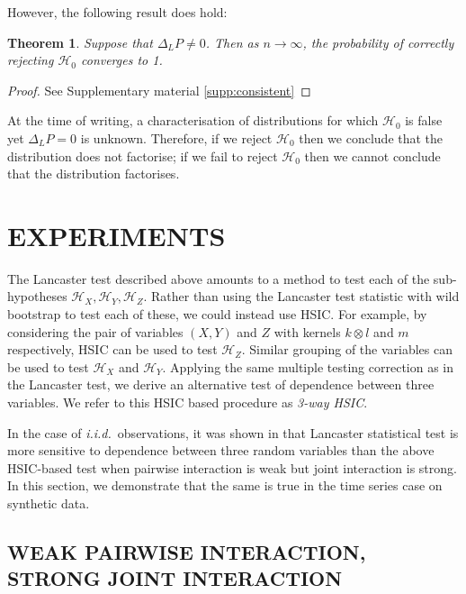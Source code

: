 \documentclass[]{article}
\newtheorem{theorem}{Theorem}
\begin{document}
However, the following result does hold:

\begin{theorem}\label{theorem:consistent}
Suppose that $\Delta_LP \not =0$. Then as $n\longrightarrow\infty$, the probability of correctly rejecting $\mathcal{H}_0$ converges to 1.
\end{theorem}
\begin{proof}
See Supplementary material \ref{supp:consistent}
\end{proof}

At the time of writing, a characterisation of distributions for which $\mathcal{H}_0$ is false yet $\Delta_LP=0$ is unknown. Therefore, if we reject $\mathcal{H}_0$ then we conclude that the distribution does not factorise; if we fail to reject $\mathcal{H}_0$ then we cannot conclude that the distribution factorises.


\section{EXPERIMENTS}\label{section:experiments}

The Lancaster test described above amounts to a method to test each of the sub-hypotheses $\mathcal{H}_X, \mathcal{H}_Y, \mathcal{H}_Z$. Rather than using the Lancaster test statistic with wild bootstrap to test each of these, we could instead use HSIC. For example, by considering the pair of variables $(X,Y)$ and $Z$ with kernels $k\otimes l$ and $m$ respectively, HSIC can be used to test $\mathcal{H}_Z$. Similar grouping of the variables can be used to test $\mathcal{H}_X$ and $\mathcal{H}_Y$. Applying the same multiple testing correction as in the Lancaster test, we derive an alternative test of dependence between three variables. We refer to this HSIC based procedure as \emph{3-way HSIC}.

In the case of \emph{i.i.d.}~observations, it was shown in \citet{sejdinovic2013kernel} that Lancaster statistical test is more sensitive to dependence between three random variables than the above HSIC-based test when pairwise interaction is weak but joint interaction is strong. In this section, we demonstrate that the same is true in the time series case on synthetic data.




\subsection{WEAK PAIRWISE INTERACTION, STRONG JOINT INTERACTION}\label{experiment1}
\end{document}
